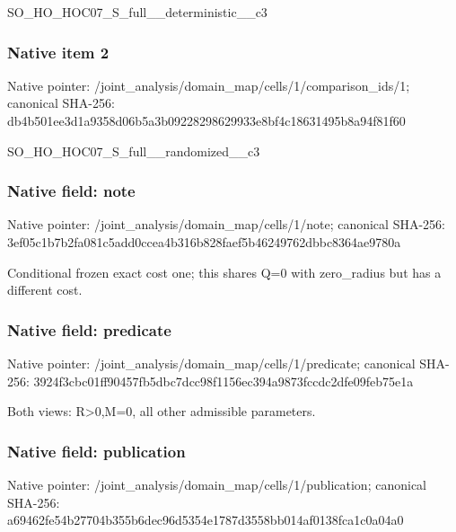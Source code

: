 \documentclass[10pt,a4paper]{article}
\begin{document}
\begingroup\raggedright\sloppy SO\_\allowbreak{}HO\_\allowbreak{}HOC07\_\allowbreak{}S\_\allowbreak{}full\_\allowbreak{}\_\allowbreak{}deterministic\_\allowbreak{}\_\allowbreak{}c3\par\endgroup

\subsubsection{Native item 2}
Native pointer: /joint\_\allowbreak{}analysis/domain\_\allowbreak{}map/cells/1/comparison\_\allowbreak{}ids/1; canonical SHA-256: db4b501ee3d1a9358d06b5a3b09228298629933e8bf4c18631495b8a94f81f60

\begingroup\raggedright\sloppy SO\_\allowbreak{}HO\_\allowbreak{}HOC07\_\allowbreak{}S\_\allowbreak{}full\_\allowbreak{}\_\allowbreak{}randomized\_\allowbreak{}\_\allowbreak{}c3\par\endgroup

\subsubsection{Native field: note}
Native pointer: /joint\_\allowbreak{}analysis/domain\_\allowbreak{}map/cells/1/note; canonical SHA-256: 3ef05c1b7b2fa081c5add0ccea4b316b828faef5b46249762dbbc8364ae9780a

\begingroup\raggedright\sloppy Conditional frozen exact cost one;\allowbreak{} this shares Q=\allowbreak{}0 with zero\_\allowbreak{}radius but has a different cost.\par\endgroup

\subsubsection{Native field: predicate}
Native pointer: /joint\_\allowbreak{}analysis/domain\_\allowbreak{}map/cells/1/predicate; canonical SHA-256: 3924f3cbc01ff90457fb5dbc7dcc98f1156ec394a9873fccdc2dfe09feb75e1a

\begingroup\raggedright\sloppy Both views:\allowbreak{} R>0,\allowbreak{}M=\allowbreak{}0,\allowbreak{} all other admissible parameters.\par\endgroup

\subsubsection{Native field: publication}
Native pointer: /joint\_\allowbreak{}analysis/domain\_\allowbreak{}map/cells/1/publication; canonical SHA-256: a69462fe54b27704b355b6dec96d5354e1787d3558bb014af0138fca1c0a04a0
\end{document}
